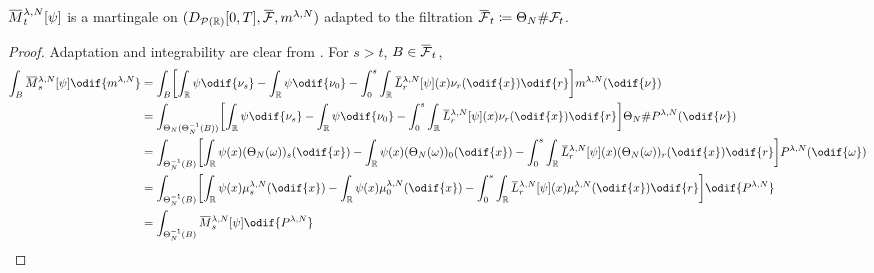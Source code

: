 \begin{corollary}\label{cor:emp-M-mart}
  \(\ol{M}_t^{\lambda, N}[\psi]\) is a martingale on \((D_{\cP(\potspace)}[0,T], \ol{\cF}, \lawmu^{\lambda,N})\) adapted to the filtration \(\ol{\cF}_t \coloneqq \Theta_N \# \cF_t\).
\end{corollary}
\begin{proof}
  Adaptation and integrability are clear from . %
  For \(s > t\), \(B \in \ol{\cF}_t\),
  \begin{equation}
    \begin{split}
      \int_B \ol{M}_{s}^{\lambda, N}[\psi] \odif{\lawmu^{\lambda,N}}
       & = \int_B \sbr*{ \int_\potspace \psi \odif{\nu_s} - \int_\potspace \psi \odif{\nu_0} - \int_0^s \int_\potspace \ol{L}_r^{\lambda, N} [\psi](x) \nu_{r}(\odif{x}) \odif{r} } \lawmu^{\lambda,N} (\odif{\nu})                                                                          \\
       & = \int_{\Theta_N(\Theta_N^{-1}(B))} \sbr*{ \int_\potspace \psi \odif{\nu_s} - \int_\potspace \psi \odif{\nu_0} - \int_0^s \int_\potspace \ol{L}_r^{\lambda, N} [\psi](x) \nu_{r}(\odif{x}) \odif{r} } \Theta_N \# P^{\lambda, N} (\odif{\nu})                                       \\ %
       & = \int_{\Theta_N^{-1}(B)} \sbr*{ \int_\potspace \psi(x) (\Theta_N(\omega))_s(\odif{x}) - \int_\potspace \psi(x) (\Theta_N(\omega))_0(\odif{x}) - \int_0^s \int_\potspace \ol{L}_r^{\lambda, N} [\psi](x) (\Theta_N(\omega))_{r}(\odif{x}) \odif{r} } P^{\lambda, N} (\odif{\omega}) \\
       & = \int_{\Theta_N^{-1}(B)} \sbr*{ \int_\potspace \psi(x) \mu_s^{\lambda,N}(\odif{x}) - \int_\potspace \psi(x) \mu_0^{\lambda,N}(\odif{x}) - \int_0^s \int_\potspace \ol{L}_r^{\lambda, N} [\psi](x) \mu_{r}^{\lambda,N}(\odif{x}) \odif{r} } \odif{P^{\lambda, N}}                   \\
       & = \int_{\Theta_N^{-1}(B)} \ol{M}_s^{\lambda, N}[\psi] \odif{P^{\lambda, N}}                                                                                                                                                                                                         \\

\end{split}
\end{equation}
\end{proof}
